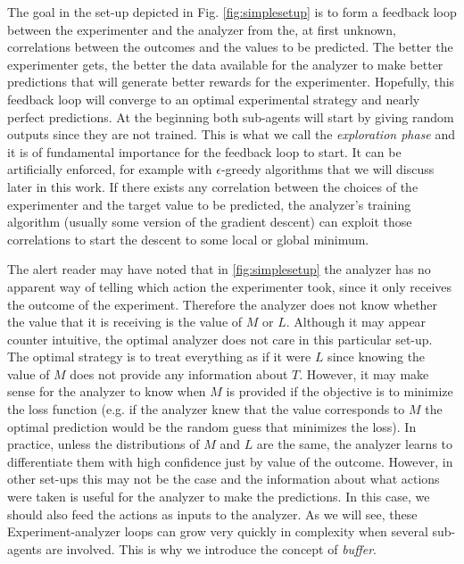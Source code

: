 \documentclass[11pt,a4paper,twoside]{report}
\newcommand{\+}{\textnormal{+} }
\theoremstyle{definition}
\numberwithin{equation}{chapter}
\begin{document}
The goal in the set-up depicted in Fig. \ref{fig:simplesetup} is to form a
feedback loop between the experimenter and the analyzer from the, at first
unknown, correlations between the outcomes and the values to be predicted. The
better the experimenter gets, the better the data available for the analyzer to
make better predictions that will generate better rewards for the experimenter.
Hopefully, this feedback loop will converge to an optimal experimental strategy
and nearly perfect predictions. At the beginning both sub-agents will
start by giving random outputs since they are not trained. This is what we call
the \textit{exploration phase} and it is of fundamental importance for the
feedback loop to start. It can be artificially enforced, for example with
$\epsilon$-greedy algorithms that we will discuss later in this work. If there
exists any correlation between the choices of the experimenter and the target
value to be predicted, the analyzer's training algorithm (usually some version
of the gradient descent) can exploit those correlations to start the descent to some
local or global minimum.

The alert reader may have noted that in \ref{fig:simplesetup} the analyzer has
no apparent way of telling which action the experimenter took, since it only
receives the outcome of the experiment. Therefore the analyzer does not know
whether the value that it is receiving is the value of $M$ or $L$. Although it
may appear counter intuitive, the optimal analyzer does not care in this
particular set-up. The optimal strategy is to treat everything as if it were $L$
since knowing the value of $M$ does not provide any information about $T$.
However, it may make sense for the analyzer to know when $M$ is provided if the
objective is to minimize the loss function (e.g. if the analyzer knew that the
value corresponds to $M$ the optimal prediction would be the random guess that
minimizes the loss). In practice, unless the distributions of $M$ and $L$ are
the same, the analyzer learns to differentiate them with high confidence just by
value of the outcome. However, in other set-ups this may not be the case and the
information about what actions were taken is useful for the analyzer to make the
predictions. In this case, we should also feed the actions as inputs to the
analyzer. As we will see, these Experiment-analyzer loops can grow very quickly
in complexity when several sub-agents are involved. This is why we introduce the
concept of \textit{buffer}.
\end{document}
